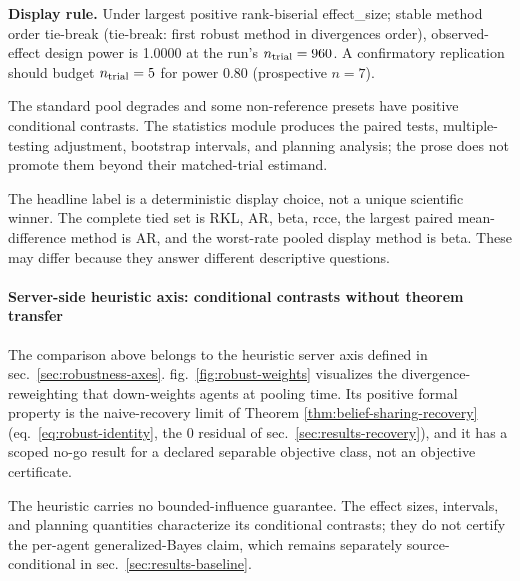 \documentclass[
  english,
]{article}
\theoremstyle{plain}
\theoremstyle{definition}
\theoremstyle{remark}
\theoremstyle{definition}
\begin{document}
\textbf{Display rule.} Under largest positive rank-biserial
effect\_size; stable method order tie-break (tie-break: first robust
method in divergences order), observed-effect design power is 1.0000 at
the run's \(n_{\rm trial} = 960\). A confirmatory replication should
budget \(n_{\rm trial} = 5\) for power 0.80 (prospective \(n = 7\)).

The standard pool degrades and some non-reference presets have positive
conditional contrasts. The statistics module produces the paired tests,
multiple-testing adjustment, bootstrap intervals, and planning analysis;
the prose does not promote them beyond their matched-trial estimand.

The headline label is a deterministic display choice, not a unique
scientific winner. The complete tied set is RKL, AR, beta, rcce, the
largest paired mean-difference method is AR, and the worst-rate pooled
display method is beta. These may differ because they answer different
descriptive questions.

\paragraph{Server-side heuristic axis: conditional contrasts without
theorem
transfer}\label{server-side-heuristic-axis-conditional-contrasts-without-theorem-transfer}

The comparison above belongs to the heuristic server axis defined in
sec.~\ref{sec:robustness-axes}. fig.~\ref{fig:robust-weights} visualizes
the  divergence-reweighting that down-weights
agents at pooling time. Its positive formal property is the
naive-recovery limit of Theorem \ref{thm:belief-sharing-recovery}
(eq.~\ref{eq:robust-identity}, the 0 residual of
sec.~\ref{sec:results-recovery}), and it has a scoped no-go result for a
declared separable objective class, not an objective certificate.

The heuristic carries no bounded-influence guarantee. The effect sizes,
intervals, and planning quantities characterize its conditional
contrasts; they do not certify the per-agent generalized-Bayes claim,
which remains separately source-conditional in
sec.~\ref{sec:results-baseline}.
\end{document}
